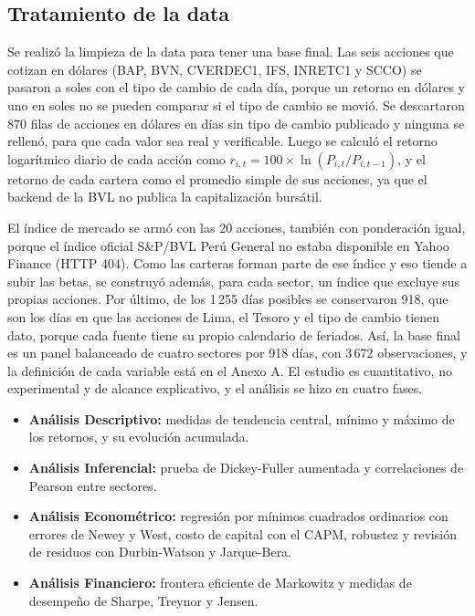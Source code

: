 \documentclass[12pt]{article}
\begin{document}
\subsection{Tratamiento de la data}
Se realizó la limpieza de la data para tener una base final. Las seis acciones que cotizan en dólares (BAP, BVN, CVERDEC1, IFS, INRETC1 y SCCO) se pasaron a soles con el tipo de cambio de cada día, porque un retorno en dólares y uno en soles no se pueden comparar si el tipo de cambio se movió. Se descartaron 870 filas de acciones en dólares en días sin tipo de cambio publicado y ninguna se rellenó, para que cada valor sea real y verificable. Luego se calculó el retorno logarítmico diario de cada acción como $r_{i,t} = 100 \times \ln(P_{i,t}/P_{i,t-1})$, y el retorno de cada cartera como el promedio simple de sus acciones, ya que el backend de la BVL no publica la capitalización bursátil.

El índice de mercado se armó con las 20 acciones, también con ponderación igual, porque el índice oficial S\&P/BVL Perú General no estaba disponible en Yahoo Finance (HTTP 404). Como las carteras forman parte de ese índice y eso tiende a subir las betas, se construyó además, para cada sector, un índice que excluye sus propias acciones. Por último, de los 1\,255 días posibles se conservaron 918, que son los días en que las acciones de Lima, el Tesoro y el tipo de cambio tienen dato, porque cada fuente tiene su propio calendario de feriados. Así, la base final es un panel balanceado de cuatro sectores por 918 días, con 3\,672 observaciones, y la definición de cada variable está en el Anexo A. El estudio es cuantitativo, no experimental y de alcance explicativo, y el análisis se hizo en cuatro fases.

\begin{itemize}
\item \textbf{Análisis Descriptivo:} medidas de tendencia central, mínimo y máximo de los retornos, y su evolución acumulada.
\item \textbf{Análisis Inferencial:} prueba de Dickey-Fuller aumentada y correlaciones de Pearson entre sectores.
\item \textbf{Análisis Econométrico:} regresión por mínimos cuadrados ordinarios con errores de Newey y West, costo de capital con el CAPM, robustez y revisión de residuos con Durbin-Watson y Jarque-Bera.
\item \textbf{Análisis Financiero:} frontera eficiente de Markowitz y medidas de desempeño de Sharpe, Treynor y Jensen.
\end{itemize}
\end{document}
